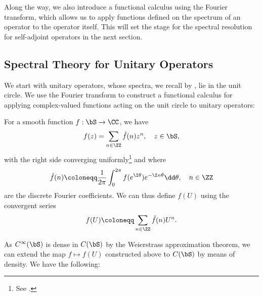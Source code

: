 \documentclass[oneside,reqno,letterpaper]{amsart}
\begin{document}
Along the way, we also introduce a functional calculus using the Fourier transform, which allows us to apply functions defined on the spectrum of an operator to the operator itself. 
This will set the stage for the spectral resolution for self-adjoint operators in the next section. 

\subsection{Spectral Theory for Unitary Operators}
We start with unitary operators, whose spectra, we recall by , lie in the unit circle.
We use the Fourier transform to construct a functional calculus for applying complex-valued functions acting on the unit circle to unitary operators:

For a smooth function \(f: \bS \to \CC\), we have
\[
  f(z) = \sum_{n \in \ZZ} \hat{f}(n) z^n, \quad z \in \bS, 
\] 
with the right side converging uniformly\footnote{See \cite[Chapter 2]{stein2003fourier}. } and where 
\[
  \hat{f}(n) \coloneqq \frac{1}{2\pi} \int_{0}^{2\pi} f(e^{\I \theta}) e^{-\I n \theta} \dd\theta, \quad  n \in \ZZ 
\] 
are the discrete Fourier coefficients.
We can thus define \(f(U)\) using the convergent series 
\[
  f(U) \coloneqq \sum_{n \in \ZZ} \hat{f}(n) U^n . 
\] 

As \(C^{\infty}(\bS)\) is dense in \(C(\bS)\) by the Weierstrass approximation theorem, we can extend the map \(f \mapsto f(U)\) constructed above to \(C(\bS)\) by means of density.
We have the following:
\end{document}
